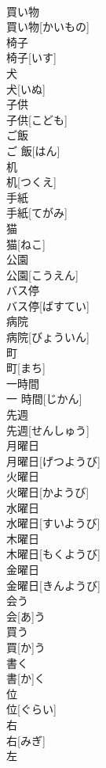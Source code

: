 \documentclass[8pt]{extreport}
\begin{document}
\begin{CJK}{UTF8}{min}
\\	買い物	
\\	買い物[かいもの]		
\\	椅子	
\\	椅子[いす]		
\\	犬	
\\	犬[いぬ]		
\\	子供	
\\	子供[こども]		
\\	ご飯	
\\	ご 飯[はん]		
\\	机	
\\	机[つくえ]		
\\	手紙	
\\	手紙[てがみ]		
\\	猫	
\\	猫[ねこ]		
\\	公園	
\\	公園[こうえん]		
\\	バス停	
\\	バス停[ばすてい]		
\\	病院	
\\	病院[びょういん]		
\\	町	
\\	町[まち]		
\\	一時間	
\\	一 時間[じかん]		
\\	先週	
\\	先週[せんしゅう]		
\\	月曜日	
\\	月曜日[げつようび]		
\\	火曜日	
\\	火曜日[かようび]		
\\	水曜日	
\\	水曜日[すいようび]		
\\	木曜日	
\\	木曜日[もくようび]		
\\	金曜日	
\\	金曜日[きんようび]		
\\	会う	
\\	会[あ]う		
\\	買う	
\\	買[か]う		
\\	書く	
\\	書[か]く		
\\	位	
\\	位[ぐらい]		
\\	右	
\\	右[みぎ]		
\\	左	

\end{CJK}
\end{document}
